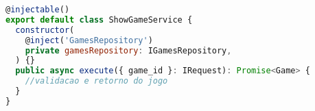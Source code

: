 \begin{lstlisting}[language=JavaScript, caption={Implementação correta do SRP},captionpos=b, label=alg:showgameservice]
@injectable()
export default class ShowGameService {
  constructor(
    @inject('GamesRepository')
    private gamesRepository: IGamesRepository,
  ) {}
  public async execute({ game_id }: IRequest): Promise<Game> {
    //validacao e retorno do jogo
  }
}
\end{lstlisting}